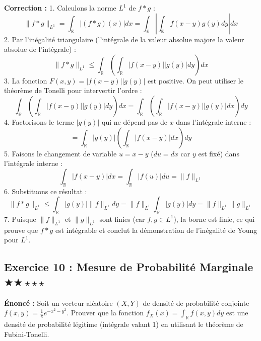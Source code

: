\documentclass[11pt,a4paper]{article}
\begin{document}
\textbf{Correction :}
1. Calculons la norme $L^1$ de $f * g$ :
   $$ \|f * g\|_{L^1} = \int_{\mathbb{R}} |(f * g)(x)| dx = \int_{\mathbb{R}} \left| \int_{\mathbb{R}} f(x-y)g(y) dy \right| dx $$
2. Par l'inégalité triangulaire (l'intégrale de la valeur absolue majore la valeur absolue de l'intégrale) :
   $$ \|f * g\|_{L^1} \le \int_{\mathbb{R}} \left( \int_{\mathbb{R}} |f(x-y)| |g(y)| dy \right) dx $$
3. La fonction $F(x, y) = |f(x-y)| |g(y)|$ est positive. On peut utiliser le théorème de Tonelli pour intervertir l'ordre :
   $$ \int_{\mathbb{R}} \left( \int_{\mathbb{R}} |f(x-y)| |g(y)| dy \right) dx = \int_{\mathbb{R}} \left( \int_{\mathbb{R}} |f(x-y)| |g(y)| dx \right) dy $$
4. Factorisons le terme $|g(y)|$ qui ne dépend pas de $x$ dans l'intégrale interne :
   $$ = \int_{\mathbb{R}} |g(y)| \left( \int_{\mathbb{R}} |f(x-y)| dx \right) dy $$
5. Faisons le changement de variable $u = x - y$ ($du = dx$ car $y$ est fixé) dans l'intégrale interne :
   $$ \int_{\mathbb{R}} |f(x-y)| dx = \int_{\mathbb{R}} |f(u)| du = \|f\|_{L^1} $$
6. Substituons ce résultat :
   $$ \|f * g\|_{L^1} \le \int_{\mathbb{R}} |g(y)| \|f\|_{L^1} dy = \|f\|_{L^1} \int_{\mathbb{R}} |g(y)| dy = \|f\|_{L^1} \|g\|_{L^1} $$
7. Puisque $\|f\|_{L^1}$ et $\|g\|_{L^1}$ sont finies (car $f, g \in L^1$), la borne est finie, ce qui prouve que $f * g$ est intégrable et conclut la démonstration de l'inégalité de Young pour $L^1$.


\subsection*{Exercice 10 : Mesure de Probabilité Marginale \quad $\bigstar\bigstar\star\star\star$}

\textbf{Énoncé :}
Soit un vecteur aléatoire $(X, Y)$ de densité de probabilité conjointe $f(x, y) = \frac{1}{\pi} e^{-x^2-y^2}$.
Prouver que la fonction $f_X(x) = \int_{\mathbb{R}} f(x, y) dy$ est une densité de probabilité légitime (intégrale valant 1) en utilisant le théorème de Fubini-Tonelli.
\end{document}

